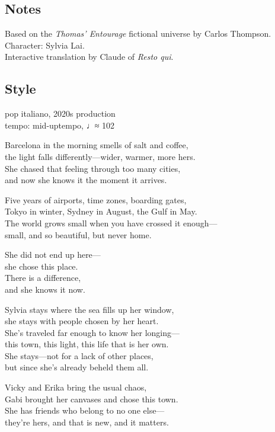 \subsection{Notes}
Based on the \emph{Thomas' Entourage} fictional universe by Carlos Thompson.\\
Character: Sylvia Lai.\\
Interactive translation by Claude of \emph{Resto qui}.

\subsection{Style}
pop italiano, 2020s production\\
tempo: mid-uptempo, ♩≈ 102

\begin{lyrics}

Barcelona in the morning smells of salt and coffee,\\
the light falls differently—wider, warmer, more hers.\\
She chased that feeling through too many cities,\\
and now she knows it the moment it arrives.

Five years of airports, time zones, boarding gates,\\
Tokyo in winter, Sydney in August, the Gulf in May.\\
The world grows small when you have crossed it enough—\\
small, and so beautiful, but never home.

She did not end up here—\\
she chose this place.\\
There is a difference,\\
and she knows it now.

Sylvia stays where the sea fills up her window,\\
she stays with people chosen by her heart.\\
She’s traveled far enough to know her longing—\\
this town, this light, this life that is her own.\\
She stays—not for a lack of other places,\\
but since she’s already beheld them all.

Vicky and Erika bring the usual chaos,\\
Gabi brought her canvases and chose this town.\\
She has friends who belong to no one else—\\
they’re hers, and that is new, and it matters.


\end{lyrics}
